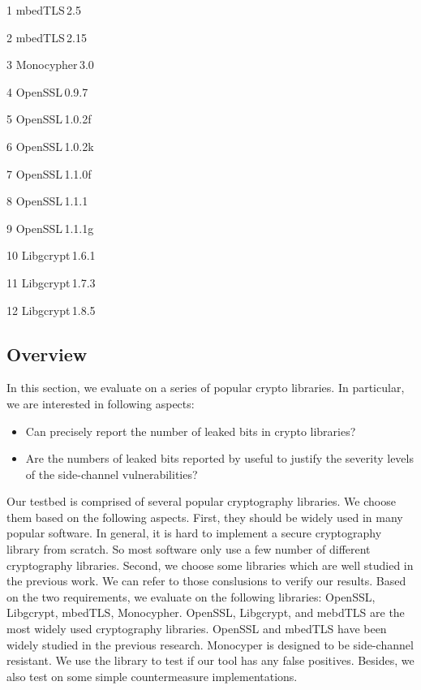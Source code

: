 \begin{table}[]
\begin{tablenotes}
        \item[1] mbedTLS\,2.5  \,~~~~~\item[2] mbedTLS\,2.15 ~\item[3] Monocypher\,3.0 \\
        \item[4] OpenSSL\,0.9.7  ~~~\item[5] OpenSSL\,1.0.2f  \item[6] OpenSSL\,1.0.2k 
        \item[7] OpenSSL\,1.1.0f ~\item[8] OpenSSL\,1.1.1 ~\item[9] OpenSSL\,1.1.1g \\
        \item[10] Libgcrypt\,1.6.1 ~\item[11] Libgcrypt\,1.7.3 \item[12] Libgcrypt\,1.8.5\\
    \end{tablenotes}
    \vspace*{-20pt}

\end{table}

\subsection{Overview}
In this section, we evaluate \tool{} on a series of popular crypto libraries.
In particular, we are interested in following aspects:
\begin{itemize}
\item Can \tool{} precisely report the number of leaked bits in crypto
          libraries? 
\item Are the numbers of leaked bits reported by \tool{} useful
          to justify the severity levels of the side-channel vulnerabilities?
\end{itemize}

Our testbed is comprised of several popular cryptography libraries. We choose them based
on the following aspects. First, they should be widely used in many popular software.
In general, it is hard to implement a secure cryptography library from scratch. So most
software only use a few number of different cryptography libraries. Second, we choose some
libraries which are well studied in the previous work. We can refer to those conslusions to
verify our results. Based on the two requirements, we evaluate \tool{} on the following libraries:
OpenSSL, Libgcrypt, mbedTLS, Monocypher. OpenSSL, Libgcrypt, and mebdTLS are the most widely used
cryptography libraries. OpenSSL and mbedTLS have been widely studied in the previous research.
Monocyper is designed to be side-channel resistant. We use the library to test if our tool has any
false positives. Besides, we also test \tool{} on some simple countermeasure implementations. 

